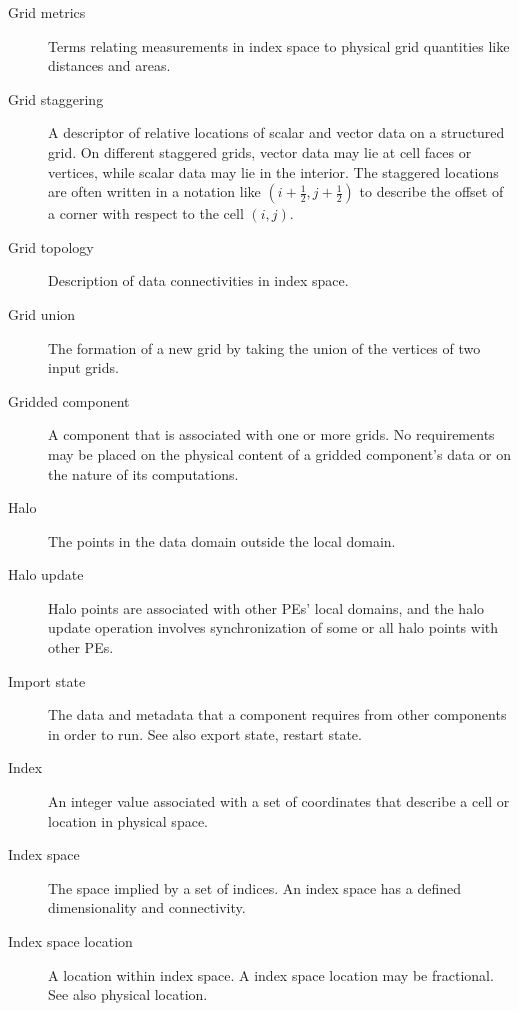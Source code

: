 \begin{description}
\item[Grid metrics] \label{glos:GridMetrics} Terms relating measurements 
  in index space to physical grid quantities like distances and areas.

\item[Grid staggering] \label{glos:GridStagger} 
  A descriptor of relative locations
  of scalar and vector data on a structured grid. On different
  staggered grids, vector data may lie at cell faces or vertices,
  while scalar data may lie in the interior. The staggered locations
  are often written in a notation like $(i+\frac12,j+\frac12)$ to
  describe the offset of a corner with respect to the cell $(i,j)$.

\item[Grid topology] \label{glos:GridTopo} Description of data 
  connectivities in index space.

\item[Grid union] \label{glos:GridUnion} The formation of a new grid
  by taking the union of the vertices of two input grids. 

\item[Gridded component] \label{glos:GridComp}
  A component that is associated with one or more grids.  No requirements 
  may be placed on the physical content of a gridded component's data or 
  on the nature of its computations. 

\item[Halo] \label{glos:Halo} 
  The points in the data domain outside the local domain. 

\item[Halo update] \label{glos:HaloUpdate}
  Halo points are associated with other PEs'
  local domains, and the halo update operation involves
  synchronization of some or all halo points with other PEs. 

\item[Import state] \label{glos:ImportState} The data and metadata 
  that a component requires from other components in order to run.  
  See also export state, restart state.

\item[Index] \label{glos:Index} An integer value associated with a set
  of coordinates that describe a cell or location in physical space.

\item[Index space] \label{glos:IndexSpace} The space implied 
  by a set of indices.  An index space has a defined dimensionality and 
  connectivity.

\item[Index space location] \label{glos:IndexSpaceloc} 
  A location within index space.  A index space location may be fractional.
  See also physical location.


\end{description}
